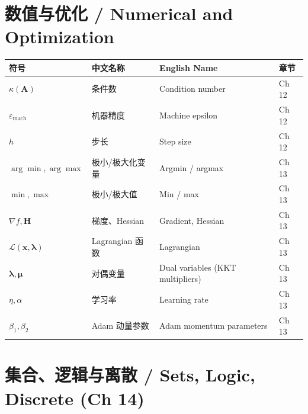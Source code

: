 \section{数值与优化 / Numerical and Optimization}

\begin{center}
\renewcommand{\arraystretch}{1.25}
\begin{tabular}{@{}llll@{}}
\toprule
\textbf{符号} & \textbf{中文名称} & \textbf{English Name} & \textbf{章节} \\
\midrule
$\kappa(\mathbf{A})$ & 条件数 & Condition number & Ch 12 \\
$\varepsilon_{\text{mach}}$ & 机器精度 & Machine epsilon & Ch 12 \\
$h$ & 步长 & Step size & Ch 12 \\
$\arg\min, \arg\max$ & 极小/极大化变量 & Argmin / argmax & Ch 13 \\
$\min, \max$ & 极小/极大值 & Min / max & Ch 13 \\
$\nabla f, \mathbf{H}$ & 梯度、Hessian & Gradient, Hessian & Ch 13 \\
$\mathcal{L}(\mathbf{x}, \boldsymbol{\lambda})$ & Lagrangian 函数 & Lagrangian & Ch 13 \\
$\boldsymbol{\lambda}, \boldsymbol{\mu}$ & 对偶变量 & Dual variables (KKT multipliers) & Ch 13 \\
$\eta, \alpha$ & 学习率 & Learning rate & Ch 13 \\
$\beta_1, \beta_2$ & Adam 动量参数 & Adam momentum parameters & Ch 13 \\
\bottomrule
\end{tabular}
\end{center}

\section{集合、逻辑与离散 / Sets, Logic, Discrete (Ch 14)}

